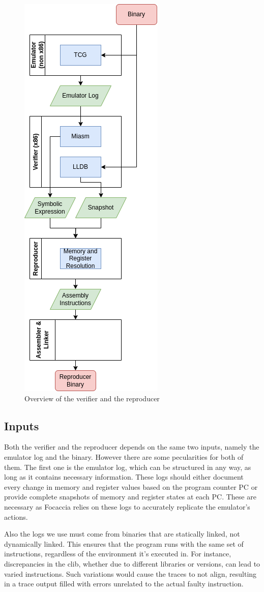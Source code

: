 \begin{figure}[ht]
   \centering
   \includegraphics[width=0.4\linewidth]{figures/ver_and_rep_1}
   \caption[Verifier and reproducer]{Overview of the verifier and the reproducer}
   \label{fig:ver_and_rep_1}
\end{figure}

\subsection{Inputs}
Both the verifier and the reproducer depends on the same two inputs, namely the emulator log and the binary.
However there are some pecularities for both of them.
The first one is the emulator log, which can be structured in any way, as long as it contains necessary information.
These logs should either document every change in memory and register values based on the program counter \ac{PC} or provide complete snapshots of memory and register states at each PC.
These are necessary as Focaccia relies on these logs to accurately replicate the emulator's actions.

Also the logs we use must come from binaries that are statically linked, not dynamically linked.
This ensures that the program runs with the same set of instructions, regardless of the environment it's executed in.
For instance, discrepancies in the \ac{clib}, whether due to different libraries or versions, can lead to varied instructions.
Such variations would cause the traces to not align, resulting in a trace output filled with errors unrelated to the actual faulty instruction.

